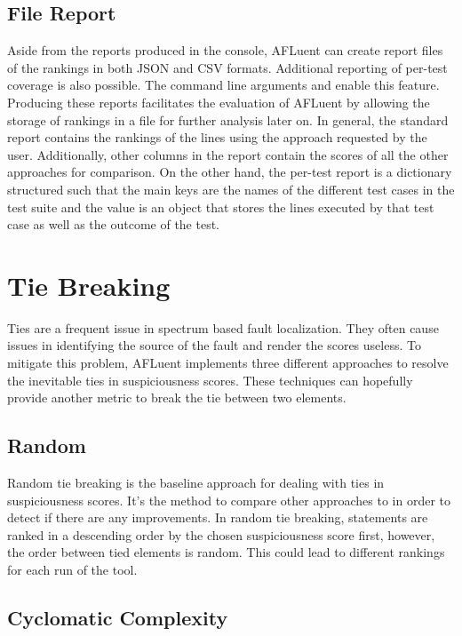 \subsection{File Report}
\label{subsec:file_output}

Aside from the reports produced in the console, AFLuent can create report files
of the rankings in both JSON and CSV formats. Additional reporting of per-test
coverage is also possible. The command line arguments  and
 enable this feature. Producing these reports facilitates
the evaluation of AFLuent by allowing the storage of rankings in a file for
further analysis later on. In general, the standard report contains the rankings
of the lines using the approach requested by the user. Additionally, other
columns in the report contain the scores of all the other approaches for
comparison. On the other hand, the per-test report is a dictionary structured
such that the main keys are the names of the different test cases in the test
suite and the value is an object that stores the lines executed by that test
case as well as the outcome of the test.

\section{Tie Breaking}
\label{sec:tiebreaking}

Ties are a frequent issue in spectrum based fault localization. They often cause
issues in identifying the source of the fault and render the scores useless. To
mitigate this problem, AFLuent implements three different approaches to resolve
the inevitable ties in suspiciousness scores. These techniques can hopefully
provide another metric to break the tie between two elements.

\subsection{Random}
\label{subsec:tiebreak_random}

Random tie breaking is the baseline approach for dealing with ties in
suspiciousness scores. It's the method to compare other approaches to in order
to detect if there are any improvements. In random tie breaking, statements are
ranked in a descending order by the chosen suspiciousness score first, however,
the order between tied elements is random. This could lead to different rankings
for each run of the tool.

\subsection{Cyclomatic Complexity}
\label{subsec:c_complexity}


